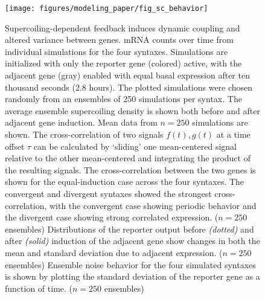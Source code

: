 \documentclass[11pt]{article}
\begin{document}
\begin{figure}[htbp]
    \centering
    {\texttt{[image: figures/modeling\_paper/fig\_sc\_behavior]}
    \label{fig:sc_examples}
    \label{fig:sc_density}
    \label{fig:cross_correlation_cartoon}
    \label{fig:orientation_cross_correlation}
    \label{fig:output_distribution_by_orientation_dynamics}
    \label{fig:noise_by_orientation}
    }
\end{figure}
\begin{figure}[htbp]
    \ContinuedFloat
    \caption{Supercoiling-dependent feedback induces dynamic coupling and altered variance between genes.
         mRNA counts over time from individual simulations for the four syntaxes. Simulations are initialized with only the reporter gene (colored) active, with the adjacent gene (gray) enabled with equal basal expression after ten thousand seconds (2.8 hours). The plotted simulations were chosen randomly from an ensembles of 250 simulations per syntax.
         The average ensemble supercoiling density is shown both before and after adjacent gene induction. Mean data from \(n=250\) simulations are shown.
         The cross-correlation of two signals \(f(t), g(t)\) at a time offset \(\tau\) can be calculated by `sliding' one mean-centered signal relative to the other mean-centered and integrating the product of the resulting signals.
         The cross-correlation between the two genes is shown for the equal-induction case across the four syntaxes. The convergent and divergent syntaxes showed the strongest cross-correlation, with the convergent case showing periodic behavior and the divergent case showing strong correlated expression. (\(n=250\) ensembles)
         Distributions of the reporter output before \textit{(dotted)} and after \textit{(solid)} induction of the adjacent gene show changes in both the mean and standard deviation due to adjacent expression. (\(n=250\) ensembles)
         Ensemble noise behavior for the four simulated syntaxes is shown by plotting the standard deviation of the reporter gene as a function of time. (\(n=250\) ensembles)
    }
    \label{fig:top:single_cell_behavior}
\end{figure}
\end{document}

